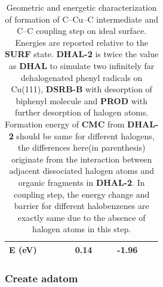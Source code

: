 \documentclass[%
 reprint,
 amsmath,amssymb,
 aps,
prb,
floatfix,
]{revtex4-2}
\begin{document}
\begin{table}
\begin{tabular}{ lccccccccc  }
 \hline
 E (\si{\electronvolt})~\cite{jacs2013} & & & & 0.14 & & & -1.96 & &\\
 \hline
 \hline
\end{tabular}
\caption{Geometric and energetic characterization of formation of C--Cu--C intermediate and C--C coupling step on ideal surface. Energies are reported relative to the \textbf{SURF} state. \textbf{DHAL-2} is twice the value as \textbf{DHAL} to simulate two infinitely far dehalogenated phenyl radicals on Cu(111), \textbf{DSRB-B} with desorption of biphenyl molecule and \textbf{PROD} with further desorption of halogen atoms. Formation energy of \textbf{CMC} from \textbf{DHAL-2} should be same for different halogens, the differences here(in parenthesis) originate from the interaction between adjacent dissociated halogen atoms and organic fragments in \textbf{DHAL-2}. In coupling step, the energy change and barrier for different halobenzenes are exactly same due to the absence of halogen atoms in this step.}
\label{table:idealsurface}
\end{table}


\subsubsection{Create adatom}
\end{document}
